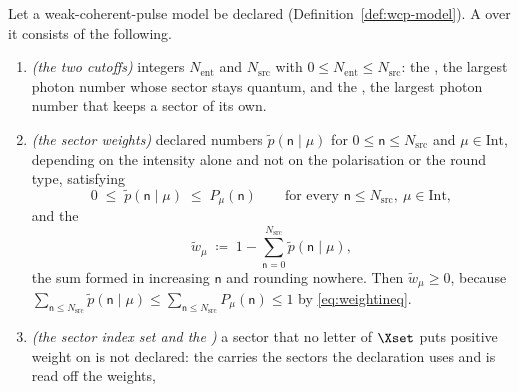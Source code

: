 \begin{definition}\label{def:tagged-source}
Let a weak-coherent-pulse model be declared (Definition~\ref{def:wcp-model}). A
over it consists of the following.
\begin{enumerate}[label=(T\arabic*),leftmargin=3.0em]
\item \emph{(the two cutoffs)} integers $N_{\mathrm{ent}}$ and
$N_{\mathrm{src}}$ with $0\le N_{\mathrm{ent}}\le N_{\mathrm{src}}$: the
,
the largest photon number whose sector stays quantum, and the
,
the largest photon number that keeps a sector of its own.
\item \emph{(the sector weights)} declared numbers $\tilde p(\mathsf{n}\mid\mu)$
for $0\le\mathsf{n}\le N_{\mathrm{src}}$ and $\mu\in\mathrm{Int}$, depending on
the intensity alone and not on the polarisation or the round type, satisfying
\begin{equation}\label{eq:weightineq}
  0\;\le\;\tilde p(\mathsf{n}\mid\mu)\;\le\;P_{\mu}(\mathsf{n})
  \qquad\text{for every }\mathsf{n}\le N_{\mathrm{src}},\ \mu\in\mathrm{Int} ,
\end{equation}
and the
\begin{equation}\label{eq:tailweight}
  \tilde w_{\mu}\;\coloneqq\;
  1-\sum_{\mathsf{n}=0}^{N_{\mathrm{src}}}\tilde p(\mathsf{n}\mid\mu) ,
\end{equation}
the sum formed in increasing $\mathsf{n}$ and rounding nowhere. Then
$\tilde w_{\mu}\ge0$, because
$\sum_{\mathsf{n}\le N_{\mathrm{src}}}\tilde p(\mathsf{n}\mid\mu)
\le\sum_{\mathsf{n}\le N_{\mathrm{src}}}P_{\mu}(\mathsf{n})\le1$ by
\eqref{eq:weightineq}.
\item \emph{(the sector index set and the )} a
sector that no letter of $\Xset$ puts positive weight on is not declared: the
carries the sectors the declaration uses and is read off the weights,
\begin{equation}\label{eq:tset}
\begin{aligned}

\end{aligned}
\end{equation}
\end{enumerate}
\end{definition}
